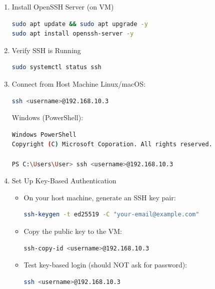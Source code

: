 \documentclass[12pt,a4paper]{report}
\begin{document}
\begin{enumerate}
\item Install OpenSSH Server (on VM)
\begin{lstlisting}[language=bash]
sudo apt update && sudo apt upgrade -y
sudo apt install openssh-server -y
\end{lstlisting}

\item Verify SSH is Running
\begin{lstlisting}[language=bash]
sudo systemctl status ssh
\end{lstlisting}

\item Connect from Host Machine
Linux/macOS:
\begin{lstlisting}[language=bash]
ssh <username>@192.168.10.3
\end{lstlisting}

Windows (PowerShell):
\begin{lstlisting}[language=bash]
Windows PowerShell
Copyright (C) Microsoft Coporation. All rights reserved.

PS C:\Users\User> ssh <username>@192.168.10.3
\end{lstlisting}

\item Set Up Key-Based Authentication
\begin{itemize}
\item On your host machine, generate an SSH key pair:
\begin{lstlisting}[language=bash]
ssh-keygen -t ed25519 -C "your-email@example.com"
\end{lstlisting}
\item Copy the public key to the VM:
\begin{lstlisting}[language=bash]
ssh-copy-id <username>@192.168.10.3
\end{lstlisting}
\item Test key-based login (should NOT ask for password):
\begin{lstlisting}[language=bash]
ssh <username>@192.168.10.3
\end{lstlisting}
\end{itemize}


\end{enumerate}
\end{document}

